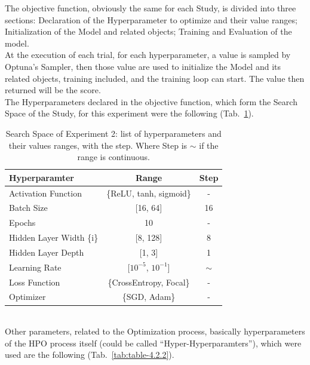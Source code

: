 The objective function, obviously the same for each Study, is divided into three sections: Declaration of the Hyperparameter to optimize and their value ranges; Initialization of the Model and related objects; Training and Evaluation of the model.
\\[0.3cm]At the execution of each trial, for each hyperparameter, a value is sampled by Optuna's Sampler, then those value are used to initialize the Model and its related objects, training included, and the training loop can start. The value then returned will be the score.
% 
\\[0.3cm]The Hyperparameters declared in the objective function, which form the Search Space of the Study, for this experiment were the following (Tab.~\ref{tab:table-4.2.1}).
\begin{table}[ht!]
	\center
	\setlength{\tabcolsep}{0.5cm}
	\caption[Search Space of Experiment 2]{Search Space of Experiment 2: list of hyperparameters and their values ranges, with the step. Where Step is $\sim$ if the range is continuous.}
	\begin{tabular}{@{}lcc@{}}
		\toprule
		\textbf{Hyperparamter}   & \textbf{Range}             & \textbf{Step} \\ \midrule
		Activation Function      & \{ReLU, tanh, sigmoid\}    & -             \\[0.1cm]
		Batch Size               & {[}16, 64{]}               & 16            \\[0.1cm]
		Epochs                   & 10                         & -             \\[0.1cm]
		Hidden Layer Width \{i\} & {[}8, 128{]}               & 8             \\[0.1cm]
		Hidden Layer Depth       & {[}1, 3{]}                 & 1             \\[0.1cm]
		Learning Rate            & {[}$10^{-5}$, $10^{-1}${]} & $\sim$        \\[0.1cm]
		Loss Function            & \{CrossEntropy, Focal\}    & -             \\[0.1cm]
		Optimizer                & \{SGD, Adam\}              & -             \\ \bottomrule
	\end{tabular}
	\label{tab:table-4.2.1}
\end{table}
% 
\\[0.3cm]Other parameters, related to the Optimization process, basically hyperparameters of the HPO process itself (could be called “Hyper-Hyperparamters”), which were used are the following (Tab.~\ref{tab:table-4.2.2}).
